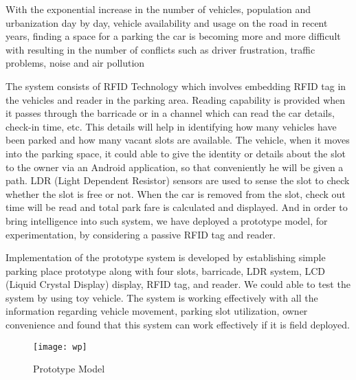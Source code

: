\documentclass[12pt,a4paper]{report}
\renewcommand{\headrulewidth}{0pt}
\renewcommand{\headrulewidth}{2.5pt}
\begin{document}
	With the exponential increase in the number of vehicles, population and
	urbanization day by day, vehicle availability and usage on the road in recent years,
	finding a space for a parking the car is becoming more and more difficult with
	resulting in the number of conflicts such as driver frustration, traffic problems, noise
	and air pollution
	
	The system consists of RFID Technology which involves embedding RFID tag in the
	vehicles and reader in the parking area. Reading capability is provided when it passes
	through the barricade or in a channel which can read the car details, check-in time, etc.
	This details will help in identifying how many vehicles have been parked and how many
	vacant slots are available. The vehicle, when it moves into the parking space, it could
	able to give the identity or details about the slot to the owner via an Android
	application, so that conveniently he will be given a path. LDR (Light Dependent
	Resistor) sensors are used to sense the slot to check whether the slot is free or not.
	When the car is removed from the slot, check out time will be read and total park fare
	is calculated and displayed. And in order to bring intelligence into such system, we
	have deployed a prototype model, for experimentation, by considering a passive
	RFID tag and reader.
	
	Implementation of the prototype system is developed by establishing simple
	parking place prototype along with four slots, barricade, LDR system, LCD (Liquid
	Crystal Display) display, RFID tag, and reader. We could able to test the system by
	using toy vehicle. The system is working effectively with all the information
	regarding vehicle movement, parking slot utilization, owner convenience and found
	that this system can work effectively if it is field deployed.
	\fancypagestyle{plain}{%
		\fancyhf{} 
		\fancyfoot[LE,RO]{\thepage} %
		\renewcommand{\headrulewidth}{0pt}}
	\thispagestyle{fancy}
	\tableofcontents

	\clearpage
	
	\newpage
	\thispagestyle{fancy}
	\listoffigures
	
	\newpage
	\thispagestyle{empty}

	\begin{figure}[H]
			\begin{center}
				\texttt{[image: wp]}
			\end{center}
			\caption{Prototype Model}		
	\end{figure}
\cleardoublepage
\newpage
\thispagestyle{fancy}
\end{document}
